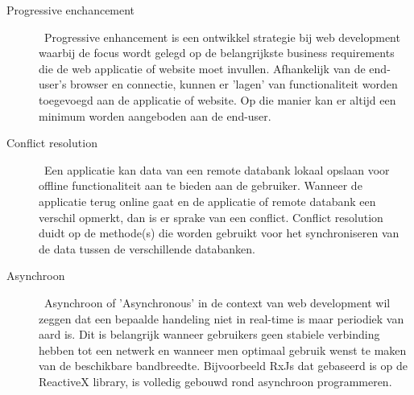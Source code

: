 \begin{description}
\item[Progressive enchancement] \hfill \ Progressive enhancement is een ontwikkel strategie bij web development waarbij de focus wordt gelegd op de belangrijkste business requirements die de web applicatie of website moet invullen. Afhankelijk van de end-user's browser en connectie, kunnen er 'lagen' van functionaliteit worden toegevoegd aan de applicatie of website. Op die manier kan er altijd een minimum worden aangeboden aan de end-user.
\item[Conflict resolution] \hfill \ Een applicatie kan data van een remote databank lokaal opslaan voor offline functionaliteit aan te bieden aan de gebruiker. Wanneer de applicatie terug online gaat en de applicatie of remote databank een verschil opmerkt, dan is er sprake van een conflict. Conflict resolution duidt op de methode(s) die worden gebruikt voor het synchroniseren van de data tussen de verschillende databanken.
\item[Asynchroon] \hfill \ Asynchroon of 'Asynchronous' in de context van web development wil zeggen dat een bepaalde handeling niet in real-time is maar periodiek van aard is. Dit is belangrijk wanneer gebruikers geen stabiele verbinding hebben tot een netwerk en wanneer men optimaal gebruik wenst te maken van de beschikbare bandbreedte. Bijvoorbeeld RxJs dat gebaseerd is op de ReactiveX library, is volledig gebouwd rond asynchroon programmeren. 
\end{description}